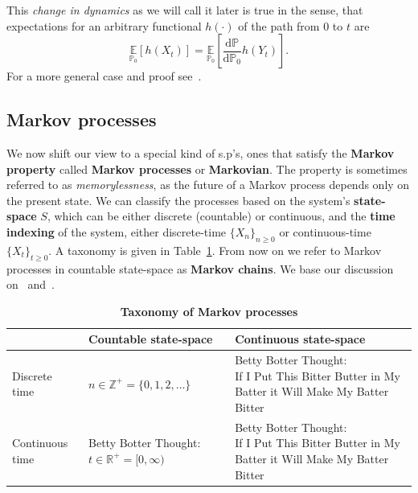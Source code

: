 This \emph{change in dynamics} as we will call it later is true in the sense, that expectations for an arbitrary functional $h(\cdot)$ of the path from $0$ to $t$ are
\begin{equation}
	\label{eq:girsanov_consequence}
	\underset{\mathbb{P}_0}{\mathbb{E}}\left[h(X_t)\right] = \underset{\mathbb{P}_0}{\mathbb{E}}\left[\frac{\mathrm{d} \mathbb{P}}{\mathrm{d} \mathbb{P}_0} h(Y_t)\right]. 
\end{equation}
For a more general case and proof see~\cite{sarkka2019applied}.

\subsection{Markov processes}
We now shift our view to a special kind of s.p's, ones that satisfy the \textbf{Markov property} called \textbf{Markov processes} or \textbf{Markovian}. The property is sometimes referred to as \emph{memorylessness}, as the future of a Markov process depends only on the present state. We can classify the processes based on the system's \textbf{state-space} $S$, which can be either discrete (countable) or continuous, and the \textbf{time indexing} of the system, either discrete-time $\{X_n\}_{n \geq 0}$ or continuous-time $\{X_t\}_{t \geq 0}$. A taxonomy is given in Table~\ref{tab:MP-taxonomy}. From now on we refer to Markov processes in countable state-space as \textbf{Markov chains}. We base our discussion on~\cite{rogers1994diffusions} and~\cite{norris1998markov}.
\begin{table}[h]
	\begin{center}
		\begin{tabular}{l|p{5cm}|p{5cm}}
			 & Countable state-space & Continuous state-space\\
			\midrule
			Discrete time & 
			\parbox{5cm}{$n \in \mathbb{Z}^{+}=\{0,1,2, \ldots\}$}  & \parbox{5cm}{Betty Botter Thought: \\ If I Put This Bitter Butter in My Batter it Will Make My Batter Bitter}\\
			\midrule
			Continuous time & 
			\parbox{5cm}{Betty Botter Thought: \\ $t \in \mathbb{R}^{+}=[0, \infty)$} & \parbox{5cm}{Betty Botter Thought: \\ If I Put This Bitter Butter in My Batter it Will Make My Batter Bitter}\\
		\end{tabular}
		\newline
		\caption[Taxonomy of Markov processes]{\textbf{Taxonomy of Markov processes}}
		\label{tab:MP-taxonomy}
	\end{center}
\end{table}
